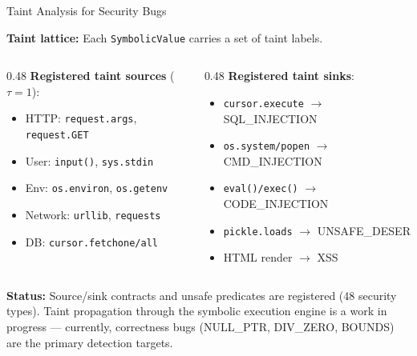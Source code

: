 \documentclass[aspectratio=169]{beamer}
\begin{document}
\begin{frame}{Taint Analysis for Security Bugs}

\textbf{Taint lattice:} Each \texttt{SymbolicValue} carries a set of taint labels.

\vspace{0.3em}
\begin{columns}[T]
\begin{column}{0.48\textwidth}
\textbf{Registered taint sources} ($\tau = 1$):
\begin{itemize}\setlength\itemsep{0pt}
  \item HTTP: \texttt{request.args}, \texttt{request.GET}
  \item User: \texttt{input()}, \texttt{sys.stdin}
  \item Env: \texttt{os.environ}, \texttt{os.getenv}
  \item Network: \texttt{urllib}, \texttt{requests}
  \item DB: \texttt{cursor.fetchone/all}
\end{itemize}
\end{column}
\begin{column}{0.48\textwidth}
\textbf{Registered taint sinks}:
\begin{itemize}\setlength\itemsep{0pt}
  \item \texttt{cursor.execute} $\to$ SQL\_INJECTION
  \item \texttt{os.system/popen} $\to$ CMD\_INJECTION
  \item \texttt{eval()/exec()} $\to$ CODE\_INJECTION
  \item \texttt{pickle.loads} $\to$ UNSAFE\_DESER
  \item HTML render $\to$ XSS
\end{itemize}
\end{column}
\end{columns}

\vspace{0.5em}
\textbf{Status:} Source/sink contracts and unsafe predicates are registered (48 security types). Taint propagation through the symbolic execution engine is a work in progress --- currently, correctness bugs (NULL\_PTR, DIV\_ZERO, BOUNDS) are the primary detection targets.

\end{frame}
\end{document}

